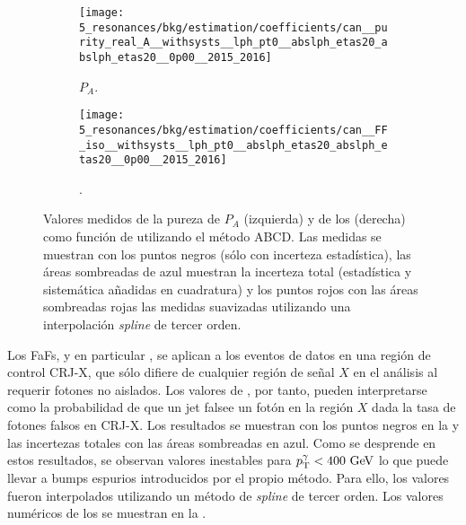 \begin{figure}[ht!]
    \centering
    \begin{subfigure}[h]{0.49\linewidth}
        \centering
        \texttt{[image: 5\_resonances/bkg/estimation/coefficients/can\_\_purity\_real\_A\_\_withsysts\_\_lph\_pt0\_\_abslph\_etas20\_abslph\_etas20\_\_0p00\_\_2015\_2016]}
        \caption{\(P_A\).}
        \label{fig:bkg:estimation:results:results:purities}
    \end{subfigure}
    \hfill
    \begin{subfigure}[h]{0.49\linewidth}
        \centering
        \texttt{[image: 5\_resonances/bkg/estimation/coefficients/can\_\_FF\_iso\_\_withsysts\_\_lph\_pt0\_\_abslph\_etas20\_abslph\_etas20\_\_0p00\_\_2015\_2016]}
        \caption{\ffiso.}
        \label{fig:bkg:estimation:results:results:ffiso}
    \end{subfigure}
    \caption{Valores medidos de la pureza de \gammajet \(P_A\) (izquierda) y de los \ffiso (derecha) como función de \ptgam utilizando el método ABCD. Las medidas se muestran con los puntos negros (sólo con incerteza estadística), las áreas sombreadas de azul muestran la incerteza total (estadística y sistemática añadidas en cuadratura) y los puntos rojos con las áreas sombreadas rojas las medidas suavizadas utilizando una interpolación \textit{spline} de tercer orden.}
    \label{fig:bkg:estimation:results:results}
\end{figure}


Los \acp{FaF}, y en particular \ffiso, se aplican a los eventos de datos en una región de control CRJ-X, que sólo difiere de cualquier región de señal \(X\) en el análisis al requerir fotones no aislados. Los valores de \ffiso, por tanto, pueden interpretarse como la probabilidad de que un jet falsee un fotón en la región \(X\) dada la tasa de fotones falsos en CRJ-X. Los resultados se muestran con los puntos negros en la \Fig{\ref{fig:bkg:estimation:results:results:ffiso}} y las incertezas totales con las áreas sombreadas en azul. Como se desprende en estos resultados, se observan valores \ffiso inestables para \(p_{\text{T}}^{\gamma}<400~\text{GeV}\) lo que puede llevar a bumps espurios introducidos por el propio método. Para ello, los valores fueron interpolados utilizando un método de \textit{spline} de tercer orden. Los valores numéricos de los \ffiso se muestran en la \Tab{\ref{tab:bkg:estimation:results:ffiso_purity_values}}.